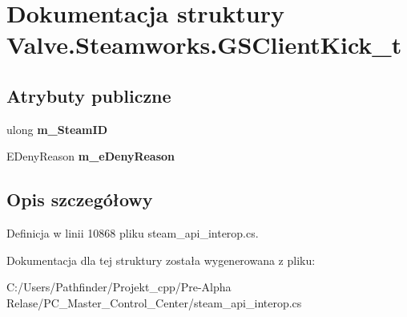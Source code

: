 \hypertarget{struct_valve_1_1_steamworks_1_1_g_s_client_kick__t}{}\section{Dokumentacja struktury Valve.\+Steamworks.\+G\+S\+Client\+Kick\+\_\+t}
\label{struct_valve_1_1_steamworks_1_1_g_s_client_kick__t}
\subsection*{Atrybuty publiczne}
\begin{DoxyCompactItemize}
\item 
\mbox{\label{struct_valve_1_1_steamworks_1_1_g_s_client_kick__t_ac231de16ef18e7569c499f967295a241}} 
ulong {\bfseries m\+\_\+\+Steam\+ID}
\item 
\mbox{\label{struct_valve_1_1_steamworks_1_1_g_s_client_kick__t_a4bf52120d5253114cb4985b4c55873c7}} 
E\+Deny\+Reason {\bfseries m\+\_\+e\+Deny\+Reason}
\end{DoxyCompactItemize}


\subsection{Opis szczegółowy}


Definicja w linii 10868 pliku steam\+\_\+api\+\_\+interop.\+cs.



Dokumentacja dla tej struktury została wygenerowana z pliku\+:\begin{DoxyCompactItemize}
\item 
C\+:/\+Users/\+Pathfinder/\+Projekt\+\_\+cpp/\+Pre-\/\+Alpha Relase/\+P\+C\+\_\+\+Master\+\_\+\+Control\+\_\+\+Center/steam\+\_\+api\+\_\+interop.\+cs\end{DoxyCompactItemize}
